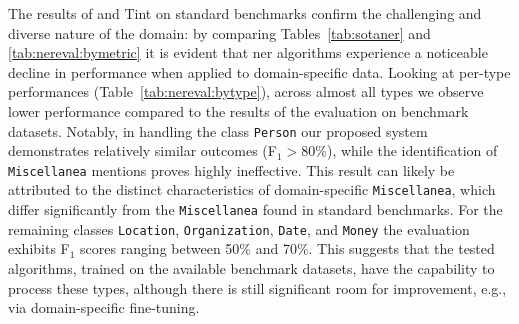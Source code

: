 The results of \spacy and Tint on standard benchmarks confirm the challenging and diverse nature of the domain: by comparing Tables~\ref{tab:sotaner} and \ref{tab:nereval:bymetric} it is evident that 
\ac{ner} algorithms experience a noticeable decline in performance when applied to domain-specific data.
Looking at per-type performances (Table~\ref{tab:nereval:bytype}), across almost all types we observe lower performance compared to the results of the evaluation on benchmark datasets. Notably, in handling the class \texttt{Person} our proposed system demonstrates relatively similar outcomes (F$_1 > 80\%$), while the identification of \texttt{Miscellanea} mentions proves highly ineffective. This result can likely be attributed to the distinct characteristics of domain-specific \texttt{Miscellanea}, which differ significantly from the \texttt{Miscellanea} found in standard benchmarks.
For the remaining classes \texttt{Location}, \texttt{Organization}, \texttt{Date}, and \texttt{Money} the evaluation exhibits F$_1$ scores ranging between 50\% and 70\%. This suggests that the tested algorithms, trained on the available benchmark datasets, have the capability to process these types, although there is still significant room for improvement, e.g., via domain-specific fine-tuning.




